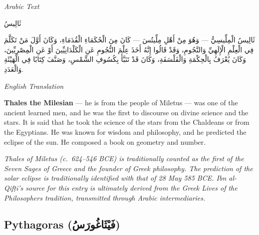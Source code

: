 \documentclass[11pt,a4paper]{article}
\def\RL#1{\beginR#1\endR}
\newcommand{\cnote}[1]{\textcolor{notecolor}{\textit{#1}}}
\newcommand{\textarabic}[1]{{\arabicfont\RL{#1}}}
\newenvironment{arabiccol}{%
  \begin{minipage}[t]{0.48\textwidth}%
  \begin{tcolorbox}[colback=leftbg,colframe=rulecolor,boxrule=0.4pt,arc=2pt,left=5pt,right=5pt,top=5pt,bottom=5pt]%
  \centering\textit{\footnotesize Arabic Text}\\[0.4em]%
  \raggedright\arabicfont\small%
}{%
  \end{tcolorbox}%
  \end{minipage}%
}
\newenvironment{englishcol}{%
  \begin{minipage}[t]{0.48\textwidth}%
  \begin{tcolorbox}[colback=rightbg,colframe=rulecolor,boxrule=0.4pt,arc=2pt,left=5pt,right=5pt,top=5pt,bottom=5pt]%
  \centering\textit{\footnotesize English Translation}\\[0.4em]%
  \raggedright\small%
}{%
  \end{tcolorbox}%
  \end{minipage}%
}
\begin{document}
\noindent
\begin{arabiccol}
\beginR
ثَالِيسُ

ثَالِيسُ الْمِلِّيسِيُّ — وَهُوَ مِنْ أَهْلِ مِلِّيتُسَ — كَانَ مِنَ الْحُكَمَاءِ الْقُدَمَاءِ، وَكَانَ أَوَّلَ مَنْ تَكَلَّمَ فِي الْعِلْمِ الْإِلَهِيِّ وَالنَّجُومِ، وَقَدْ قَالُوا إِنَّهُ أَخَذَ عِلْمَ النُّجُومِ عَنِ الْكَلْدَانِيِّينَ أَوْ عَنِ الْمِصْرِيِّينَ، وَكَانَ يُعْرَفُ بِالْحِكْمَةِ وَالْفَلْسَفَةِ، وَكَانَ قَدْ تَنَبَّأَ بِكُسُوفِ الشَّمْسِ، وَصَنَّفَ كِتَابًا فِي الْهَيْئَةِ وَالْعَدَدِ.
\endR
\end{arabiccol}
\hfill
\begin{englishcol}
\textbf{Thales the Milesian} --- he is from the people of Miletus --- was one of the ancient learned men, and he was the first to discourse on divine science and the stars. It is said that he took the science of the stars from the Chaldeans or from the Egyptians. He was known for wisdom and philosophy, and he predicted the eclipse of the sun. He composed a book on geometry and number.

\cnote{Thales of Miletus (c.~624--546 BCE) is traditionally counted as the first of the Seven Sages of Greece and the founder of Greek philosophy. The prediction of the solar eclipse is traditionally identified with that of 28 May 585 BCE. Ibn al-Qifṭī's source for this entry is ultimately derived from the Greek \textit{Lives of the Philosophers} tradition, transmitted through Arabic intermediaries.}
\end{englishcol}

\par\vspace{0.5em}

\subsection{Pythagoras (\textarabic{فَيْثَاغُورَسُ})}
\end{document}
